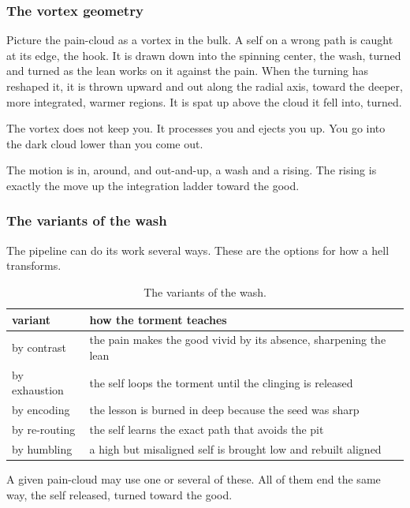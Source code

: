 \subsubsection{The vortex geometry}

Picture the pain-cloud as a vortex in the bulk. A self on a wrong path is caught at its edge, the hook. It is drawn down into the spinning center, the wash, turned and turned as the lean works on it against the pain. When the turning has reshaped it, it is thrown upward and out along the radial axis, toward the deeper, more integrated, warmer regions. It is spat up above the cloud it fell into, turned.

\begin{result}
The vortex does not keep you. It processes you and ejects you up. You go into the dark cloud lower than you come out.
\end{result}

The motion is in, around, and out-and-up, a wash and a rising. The rising is exactly the move up the integration ladder toward the good.

\subsubsection{The variants of the wash}

The pipeline can do its work several ways. These are the options for how a hell transforms.

\begin{table}[ht]
\centering
\begin{tabular}{@{}ll@{}}
\toprule
variant & how the torment teaches \\
\midrule
by contrast & the pain makes the good vivid by its absence, sharpening the lean \\
by exhaustion & the self loops the torment until the clinging is released \\
by encoding & the lesson is burned in deep because the seed was sharp \\
by re-routing & the self learns the exact path that avoids the pit \\
by humbling & a high but misaligned self is brought low and rebuilt aligned \\
\bottomrule
\end{tabular}
\caption{The variants of the wash.}
\label{tab:wash-variants}
\end{table}

A given pain-cloud may use one or several of these. All of them end the same way, the self released, turned toward the good.

